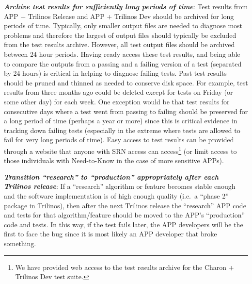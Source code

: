 \documentclass[pdf,ps2pdf,11pt]{SANDreport}
\begin{document}
{}\textit{\textbf{Archive test results for sufficiently long periods of
time}}: Test results from APP + Trilinos Release and APP + Trilinos Dev should
be archived for long periods of time.  Typically, only smaller output files
are needed to diagnose most problems and therefore the largest of output files
should typically be excluded from the test results archive.  However, all test
output files should be archived between 24 hour periods.  Having ready access
these test results, and being able to compare the outputs from a passing and a
failing version of a test (separated by 24 hours) is critical in helping to
diagnose failing tests.  Past test results should be pruned and thinned as
needed to conserve disk space.  For example, test results from three months
ago could be deleted except for tests on Friday (or some other day) for each
week.  One exception would be that test results for consecutive days where a
test went from passing to failing should be preserved for a long period of
time (perhaps a year or more) since this is critical evidence in tracking down
failing tests (especially in the extreme where tests are allowed to fail for
very long periods of time).  Easy access to test results can be provided
through a website that anyone with SRN access can access\footnote{We have
provided web access to the test results archive for the Charon + Trilinos Dev
test suite.} (or limit access to those individuals with Need-to-Know in the
case of more sensitive APPs).

{}\textit{\textbf{Transition ``research'' to ``production'' appropriately
after each Trilinos release}}: If a ``research'' algorithm or feature becomes
stable enough and the software implementation is of high enough quality (i.e.\
a ``phase 2'' package in Trilinos), then after the next Trilinos release the
``research'' APP code and tests for that algorithm/feature should be moved to
the APP's ``production'' code and tests.  In this way, if the test fails
later, the APP developers will be the first to face the bug since it is most
likely an APP developer that broke something.
\end{document}
